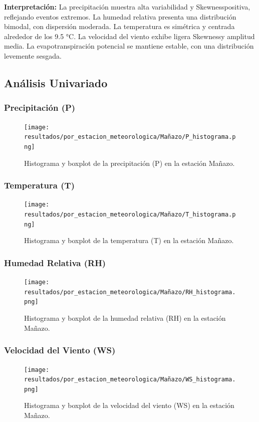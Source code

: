 \textbf{Interpretación:} La precipitación muestra alta variabilidad y Skewnesspositiva, reflejando eventos extremos. La humedad relativa presenta una distribución bimodal, con dispersión moderada. La temperatura es simétrica y centrada alrededor de los 9.5 °C. La velocidad del viento exhibe ligera Skewnessy amplitud media. La evapotranspiración potencial se mantiene estable, con una distribución levemente sesgada.

\subsection{Análisis Univariado}

\subsubsection*{Precipitación (P)}
\begin{figure}[H]
\centering
\texttt{[image: resultados/por\_estacion\_meteorologica/Mañazo/P\_histograma.png]}
\caption{Histograma y boxplot de la precipitación (P) en la estación Mañazo.}
\label{fig:manazo_P}
\end{figure}

\subsubsection*{Temperatura (T)}
\begin{figure}[H]
\centering
\texttt{[image: resultados/por\_estacion\_meteorologica/Mañazo/T\_histograma.png]}
\caption{Histograma y boxplot de la temperatura (T) en la estación Mañazo.}
\label{fig:manazo_T}
\end{figure}

\subsubsection*{Humedad Relativa (RH)}
\begin{figure}[H]
\centering
\texttt{[image: resultados/por\_estacion\_meteorologica/Mañazo/RH\_histograma.png]}
\caption{Histograma y boxplot de la humedad relativa (RH) en la estación Mañazo.}
\label{fig:manazo_RH}
\end{figure}

\subsubsection*{Velocidad del Viento (WS)}
\begin{figure}[H]
\centering
\texttt{[image: resultados/por\_estacion\_meteorologica/Mañazo/WS\_histograma.png]}
\caption{Histograma y boxplot de la velocidad del viento (WS) en la estación Mañazo.}
\label{fig:manazo_WS}
\end{figure}

